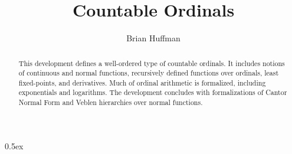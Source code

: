 \documentclass[11pt,a4paper]{article}
\begin{document}
\title{Countable Ordinals}
\author{Brian Huffman}
\maketitle
\begin{abstract}
This development defines a well-ordered type of countable ordinals.
It includes notions of continuous and normal functions, recursively
defined functions over ordinals, least fixed-points, and derivatives.
Much of ordinal arithmetic is formalized, including exponentials and
logarithms. The development concludes with formalizations of Cantor
Normal Form and Veblen hierarchies over normal functions.
\end{abstract}

\tableofcontents


\newpage

\parindent 0pt\parskip 0.5ex


\end{document}
